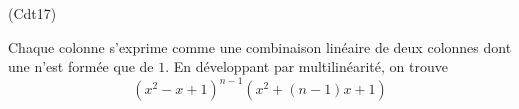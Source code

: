 \begin{tiny}(Cdt17)\end{tiny} Chaque colonne s'exprime comme une combinaison linéaire de deux colonnes dont une n'est formée que de $1$. En développant par multilinéarité, on trouve
\begin{displaymath}
 (x^2-x+1)^{n-1}(x^2+(n-1)x+1)
\end{displaymath}
